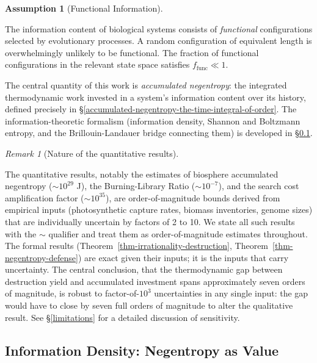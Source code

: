 \documentclass[11pt]{article}
\theoremstyle{plain}
\theoremstyle{definition}
\newtheorem{assumption}[definition]{Assumption}
\theoremstyle{remark}
\newtheorem{remark}{Remark}
\let\origsubsection\subsection
\renewcommand{\subsection}{\needspace{7\baselineskip}\origsubsection}
\begin{document}
\begin{assumption}[Functional Information]
\label{asm-functional-information}

The information content of biological systems consists of \emph{functional} configurations selected by evolutionary processes. A random configuration of equivalent length is overwhelmingly unlikely to be functional. The fraction of functional configurations in the relevant state space satisfies $f_{\text{func}} \ll 1$.
\end{assumption}

The central quantity of this work is \emph{accumulated negentropy}: the
integrated thermodynamic work invested in a system's information content
over its history, defined precisely in
§\ref{accumulated-negentropy-the-time-integral-of-order}. The
information-theoretic formalism (information density, Shannon and
Boltzmann entropy, and the Brillouin-Landauer bridge connecting them) is
developed in §\ref{information-density-negentropy-as-value}.

\begin{remark}[Nature of the quantitative results]
\label{rem-order-of-magnitude}

The quantitative results, notably the estimates of biosphere accumulated negentropy ($\sim 10^{29}$ J), the Burning-Library Ratio ($\sim 10^{-7}$), and the search cost amplification factor ($\sim 10^{35}$), are order-of-magnitude bounds derived from empirical inputs (photosynthetic capture rates, biomass inventories, genome sizes) that are individually uncertain by factors of 2 to 10. We state all such results with the $\sim$ qualifier and treat them as order-of-magnitude estimates throughout. The formal results (Theorem~\ref{thm-irrationality-destruction}, Theorem~\ref{thm-negentropy-defense}) are exact given their inputs; it is the inputs that carry uncertainty. The central conclusion, that the thermodynamic gap between destruction yield and accumulated investment spans approximately seven orders of magnitude, is robust to factor-of-$10^3$ uncertainties in any single input: the gap would have to close by seven full orders of magnitude to alter the qualitative result. See §\ref{limitations} for a detailed discussion of sensitivity.
\end{remark}

\subsection{Information Density: Negentropy as
Value}\label{information-density-negentropy-as-value}
\end{document}
